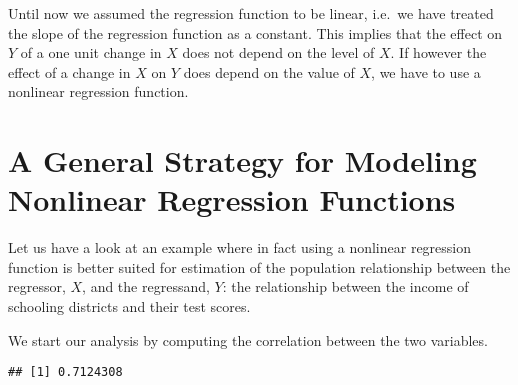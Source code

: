 \documentclass[]{book}
\newenvironment{Shaded}{\begin{snugshade}}{\end{snugshade}}
\newcommand{\KeywordTok}[1]{\textcolor[rgb]{0.13,0.29,0.53}{\textbf{#1}}}
\newcommand{\DecValTok}[1]{\textcolor[rgb]{0.00,0.00,0.81}{#1}}
\newcommand{\StringTok}[1]{\textcolor[rgb]{0.31,0.60,0.02}{#1}}
\newcommand{\CommentTok}[1]{\textcolor[rgb]{0.56,0.35,0.01}{\textit{#1}}}
\newcommand{\OperatorTok}[1]{\textcolor[rgb]{0.81,0.36,0.00}{\textbf{#1}}}
\newcommand{\NormalTok}[1]{#1}
\theoremstyle{definition}
\theoremstyle{definition}
\theoremstyle{definition}
\theoremstyle{remark}
\begin{document}
Until now we assumed the regression function to be linear, i.e.~we have
treated the slope of the regression function as a constant. This implies
that the effect on \(Y\) of a one unit change in \(X\) does not depend
on the level of \(X\). If however the effect of a change in \(X\) on
\(Y\) does depend on the value of \(X\), we have to use a nonlinear
regression function.

\section{A General Strategy for Modeling Nonlinear Regression
Functions}\label{a-general-strategy-for-modeling-nonlinear-regression-functions}

Let us have a look at an example where in fact using a nonlinear
regression function is better suited for estimation of the population
relationship between the regressor, \(X\), and the regressand, \(Y\):
the relationship between the income of schooling districts and their
test scores.

\begin{Shaded}
\end{Shaded}

We start our analysis by computing the correlation between the two
variables.

\begin{Shaded}
\end{Shaded}

\begin{verbatim}
## [1] 0.7124308
\end{verbatim}
\end{document}
